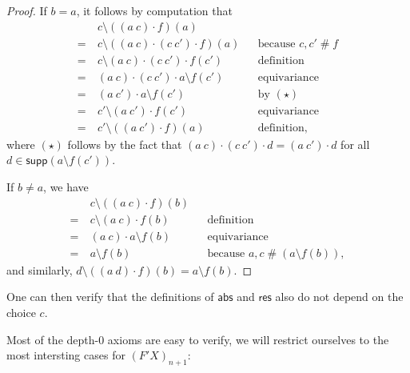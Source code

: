 \documentclass[a4paper,UKenglish,cleveref,thm-restate,numberwithinsect,final]{lipics-v2021}
\newcommand{\abs}{\mathsf{abs}}
\newcommand{\res}{\mathsf{res}}
\newcommand{\fresh}{\mathbin{\#}}
\newcommand{\supp}{\mathsf{supp}}
\theoremstyle{plain}
\numberwithin{equation}{section}
\newcommand{\+}[1]{\mathcal{#1}\xspace}
\theoremstyle{definition}
\begin{document}
\begin{proof}
  If \(b = a\), it follows by computation that
  \begin{align*}
    &c \setminus ((a\ c) \cdot f)(a) \\
    =~&c \setminus ((a\ c) \cdot (c\ c') \cdot f)(a) && \text{because } c,c'\fresh f \\
    =~&c \setminus (a\ c) \cdot (c\ c') \cdot f(c') && \text{definition} \\
    =~&(a\ c) \cdot (c\ c') \cdot a \setminus f(c') && \text{equivariance} \\
    =~&(a\ c') \cdot a \setminus f(c') && \text{by } (\star) \\
    =~&c' \setminus (a\ c') \cdot f(c') && \text{equivariance} \\
    =~&c' \setminus ((a\ c') \cdot f)(a) && \text{definition},
  \end{align*}
  where \((\star)\) follows by the fact that \((a\ c) \cdot (c\ c') \cdot d = (a\ c') \cdot d\) for all \(d \in \supp(a \setminus f(c'))\).

  If \(b \neq a\), we have
  \begin{align*}
    &c \setminus ((a\ c) \cdot f)(b) \\
    =~&c \setminus (a\ c) \cdot f(b) && \text{definition} \\
    =~&(a\ c) \cdot a \setminus f(b) && \text{equivariance} \\
    =~&a \setminus f(b) && \text{because } a,c\fresh(a \setminus f(b)),
  \end{align*}
  and similarly, \(d \setminus ((a\ d) \cdot f)(b) = a \setminus f(b)\).
\end{proof}

One can then verify that the definitions of \(\abs\) and \(\res\) also do not depend on the choice \(c\).

Most of the depth-$0$ axioms are easy to verify, we will restrict ourselves to the most intersting cases for $(F'X)_{n + 1}$:
\end{document}
